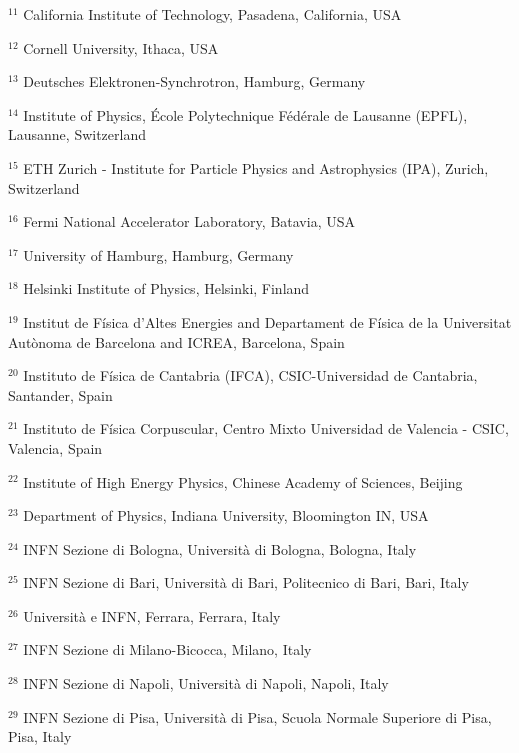 \par {\footnotesize $^{11}$ California Institute of Technology, Pasadena, California, USA}
\par {\footnotesize $^{12}$ Cornell University, Ithaca, USA}
\par {\footnotesize $^{13}$ Deutsches Elektronen-Synchrotron, Hamburg, Germany}
\par {\footnotesize $^{14}$ Institute of Physics, École Polytechnique Fédérale de Lausanne (EPFL), Lausanne, Switzerland}
\par {\footnotesize $^{15}$ ETH Zurich - Institute for Particle Physics and Astrophysics (IPA), Zurich, Switzerland}
\par {\footnotesize $^{16}$ Fermi National Accelerator Laboratory, Batavia, USA}
\par {\footnotesize $^{17}$ University of Hamburg, Hamburg, Germany}
\par {\footnotesize $^{18}$ Helsinki Institute of Physics, Helsinki, Finland}
\par {\footnotesize $^{19}$ Institut de Física d’Altes Energies and Departament de Física de la Universitat Autònoma de Barcelona and ICREA, Barcelona, Spain}
\par {\footnotesize $^{20}$ Instituto de Física de Cantabria (IFCA), CSIC-Universidad de Cantabria, Santander, Spain}
\par {\footnotesize $^{21}$ Instituto de Física Corpuscular, Centro Mixto Universidad de Valencia - CSIC, Valencia, Spain}
\par {\footnotesize $^{22}$ Institute of High Energy Physics, Chinese Academy of Sciences, Beijing}
\par {\footnotesize $^{23}$ Department of Physics, Indiana University, Bloomington IN, USA}
\par {\footnotesize $^{24}$ INFN Sezione di Bologna, Università di Bologna, Bologna, Italy}
\par {\footnotesize $^{25}$ INFN Sezione di Bari, Università di Bari, Politecnico di Bari, Bari, Italy}
\par {\footnotesize $^{26}$ Università e INFN, Ferrara, Ferrara, Italy}
\par {\footnotesize $^{27}$ INFN Sezione di Milano-Bicocca, Milano, Italy}
\par {\footnotesize $^{28}$ INFN Sezione di Napoli, Università di Napoli, Napoli, Italy}
\par {\footnotesize $^{29}$ INFN Sezione di Pisa, Università di Pisa, Scuola Normale Superiore di Pisa, Pisa, Italy}
